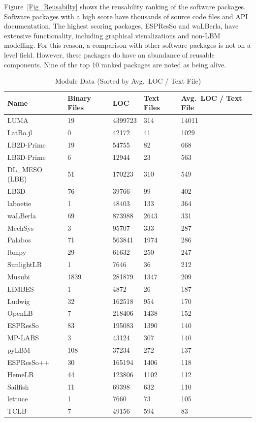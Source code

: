 \documentclass[final, 3p, times, authoryear]{elsarticle}
\begin{document}
Figure~\ref{Fig_Reusabilty} shows the reusability ranking of the software
packages. Software packages with a high score have thousands of source code
files and API documentation. The highest scoring packages, ESPResSo and
waLBerla, have extensive functionality, including graphical visualizations and
non-LBM modelling. For this reason, a comparison with other software packages is
not on a level field. However, these packages do have an abundance of reusable
components. Nine of the top 10 ranked packages are noted as being alive.

\begin{table}[ht!]
	\begin{center}
		\begin{tabular}{ p{3cm}p{2cm}p{2cm}p{2cm}p{3cm} }
			\toprule
			Name & Binary Files & LOC & Text Files & Avg.\ LOC / Text File \\
			\midrule
			LUMA & 19 & 4399723 & 314 & 14011 \\
			LatBo.jl & 0 & 42172 & 41& 1029 \\
			LB2D-Prime & 19 & 54755 & 82& 668 \\
			LB3D-Prime & 6 & 12944 & 23& 563 \\
			DL\_MESO (LBE) & 51 & 170223 & 310 & 549 \\
			LB3D & 76 & 39766 & 99 & 402 \\
			laboetie & 1 & 48403 & 133& 364 \\
			waLBerla & 69 & 873988 & 2643 & 331 \\
			MechSys & 3 & 95707 & 333 & 287 \\
			Palabos & 71 & 563841 & 1974 & 286 \\
			lbmpy & 29 & 61632 & 250 & 247 \\
			SunlightLB & 1 & 7646 & 36 & 212 \\
			Musubi & 1839 & 281879 & 1347 & 209 \\
			LIMBES & 1 & 4872 & 26 & 187 \\
			Ludwig & 32 & 162518 & 954 & 170 \\
			OpenLB & 7 & 218406 & 1438 & 152 \\
			ESPResSo & 83 & 195083 & 1390& 140 \\
			MP-LABS & 3 & 43124 & 307 & 140 \\
			pyLBM & 108 & 37234 & 272 & 137 \\
			ESPResSo++ & 30 & 165194 & 1406& 118 \\
			HemeLB & 44 & 123806 & 1102& 112 \\
			Sailfish & 11 & 69398 & 632 & 110 \\
			lettuce & 1 & 7660 & 73 & 105 \\
			TCLB & 7 & 49156 & 594 & 83 \\
			\bottomrule
		\end{tabular}
		\caption{Module Data (Sorted by Avg.\ LOC / Text File)} \label{moduledata}
	\end{center}
\end{table}
\end{document}
